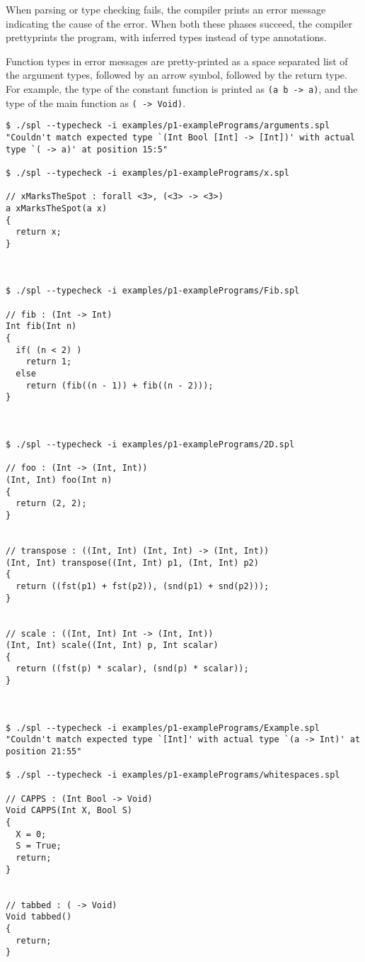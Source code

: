\documentclass[a4paper]{article}
\begin{document}
When parsing or type checking fails, the compiler prints an error message
indicating the cause of the error.  When both these phases succeed, the compiler
prettyprints the program, with inferred types instead of type annotations.

Function types in error messages are pretty-printed as a space separated list
of the argument types, followed by an arrow symbol, followed by the return
type.  For example, the type of the constant function is printed as \texttt{(a
b -> a)}, and the type of the main function as \texttt{( -> Void)}.

\begin{verbatim}
$ ./spl --typecheck -i examples/p1-examplePrograms/arguments.spl
"Couldn't match expected type `(Int Bool [Int] -> [Int])' with actual type `( -> a)' at position 15:5"

$ ./spl --typecheck -i examples/p1-examplePrograms/x.spl

// xMarksTheSpot : forall <3>, (<3> -> <3>)
a xMarksTheSpot(a x)
{
  return x;
}



$ ./spl --typecheck -i examples/p1-examplePrograms/Fib.spl

// fib : (Int -> Int)
Int fib(Int n)
{
  if( (n < 2) )
    return 1;
  else
    return (fib((n - 1)) + fib((n - 2)));
}



$ ./spl --typecheck -i examples/p1-examplePrograms/2D.spl

// foo : (Int -> (Int, Int))
(Int, Int) foo(Int n)
{
  return (2, 2);
}


// transpose : ((Int, Int) (Int, Int) -> (Int, Int))
(Int, Int) transpose((Int, Int) p1, (Int, Int) p2)
{
  return ((fst(p1) + fst(p2)), (snd(p1) + snd(p2)));
}


// scale : ((Int, Int) Int -> (Int, Int))
(Int, Int) scale((Int, Int) p, Int scalar)
{
  return ((fst(p) * scalar), (snd(p) * scalar));
}



$ ./spl --typecheck -i examples/p1-examplePrograms/Example.spl
"Couldn't match expected type `[Int]' with actual type `(a -> Int)' at position 21:55"

$ ./spl --typecheck -i examples/p1-examplePrograms/whitespaces.spl

// CAPPS : (Int Bool -> Void)
Void CAPPS(Int X, Bool S)
{
  X = 0;
  S = True;
  return;
}


// tabbed : ( -> Void)
Void tabbed()
{
  return;
}




\end{verbatim}
\end{document}
